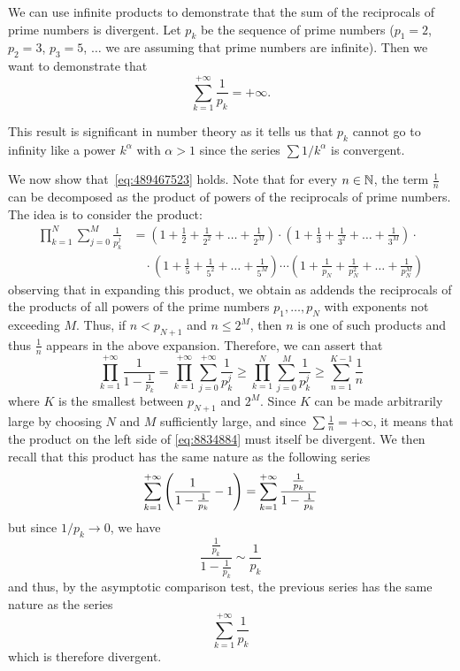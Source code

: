 \begin{example}
%
%
We can use infinite products to demonstrate that the sum of the reciprocals of
prime numbers is divergent. Let $p_k$ be the sequence of prime numbers ($p_1=2$,
$p_2=3$, $p_3=5$, $\dots$ we are assuming that prime numbers are infinite). Then
we want to demonstrate that
\begin{equation}\label{eq:489467523}
  \sum_{k=1}^{+\infty} \frac{1}{p_k} = +\infty.
\end{equation}

This result is significant in number theory as it tells us that $p_k$ cannot go
to infinity like a power $k^\alpha$ with $\alpha>1$ since the series $\sum
1/k^\alpha$ is convergent.

We now show that~\eqref{eq:489467523} holds. Note that for every $n\in {\mathbb N}$, the
term $\frac 1 n$ can be decomposed as the product of powers of the reciprocals
of prime numbers. The idea is to consider the product:
\begin{align*}
  \prod_{k=1}^{N} \sum_{j=0}^{M} \frac{1}{p_k^j}
  &= 
  (1 + \frac 1 2 + \frac 1 {2^2} + \dots + \frac{1}{2^M}) \cdot
  (1 + \frac 1 3 + \frac 1 {3^2} + \dots + \frac{1}{3^M}) \cdot \\
  &\quad \cdot(1 + \frac 1 5 + \frac 1 {5^2} + \dots + \frac{1}{5^M}) \cdots
  (1 + \frac 1 {p_N} + \frac 1 {p_N^2} + \dots + \frac{1}{p_N^M})
\end{align*}
observing that in expanding this product, we obtain as addends the reciprocals
of the products of all powers of the prime numbers $p_1,\dots, p_N$ with
exponents not exceeding $M$. Thus, if $n < p_{N+1}$ and $n \le 2^M$, then $n$ is
one of such products and thus $\frac 1 n$ appears in the above expansion.
Therefore, we can assert that
\begin{equation}\label{eq:8834884}
  \prod_{k=1}^{+\infty} \frac{1}{1-\frac{1}{p_k}}
  = \prod_{k=1}^{+\infty} \sum_{j=0}^{+\infty} \frac{1}{p_k^j}
  \ge \prod_{k=1}^{N} \sum_{j=0}^{M} \frac{1}{p_k^j}
  \ge \sum_{n=1}^{K-1} \frac 1 n
\end{equation}
where $K$ is the smallest between $p_{N+1}$ and $2^M$. Since $K$ can be made
arbitrarily large by choosing $N$ and $M$ sufficiently large, and since $\sum
\frac 1 n =+\infty$, it means that the product on the left side of
\eqref{eq:8834884} must itself be divergent. We then recall that this product
has the same nature as the following series
\[
  \sum_{k=1}^{+\infty} {\left( \frac{1}{1-\frac 1 {p_k}}-1 \right)}
  = \sum_{k=1}^{+\infty} \frac{\frac 1 {p_k}}{1-\frac{1}{p_k}}
\]
but since $1/p_k\to 0$, we have
\[
  \frac{\frac 1 {p_k}}{1-\frac{1}{p_k}}
  \sim \frac 1 {p_k}
\]
and thus, by the asymptotic comparison test, the previous series has the same
nature as the series
\[
\sum_{k=1}^{+\infty} \frac{1}{p_k}
\]
which is therefore divergent.
\end{example}

